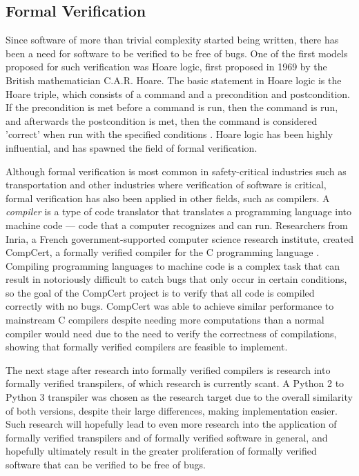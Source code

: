 \subsection{Formal Verification}
Since software of more than trivial complexity started being written, there has been a need for software to be verified to be free of bugs. One of the first models proposed for such verification was Hoare logic, first proposed in 1969 by the British mathematician C.A.R. Hoare. The basic statement in Hoare logic is the Hoare triple, which consists of a command and a precondition and postcondition. If the precondition is met before a command is run, then the command is run, and afterwards the postcondition is met, then the command is considered 'correct' when run with the specified conditions \autocite{Hoare}. Hoare logic has been highly influential, and has spawned the field of formal verification.

Although formal verification is most common in safety-critical industries such as transportation and other industries where verification of software is critical, formal verification has also been applied in other fields, such as compilers. A \textit{compiler} is a type of code translator that translates a programming language into machine code --- code that a computer recognizes and can run. Researchers from Inria, a French government-supported computer science research institute, created CompCert, a formally verified compiler for the C programming language \autocite{Leroy}. Compiling programming languages to machine code is a complex task that can result in notoriously difficult to catch bugs that only occur in certain conditions, so the goal of the CompCert project is to verify that all code is compiled correctly with no bugs. CompCert was able to achieve similar performance to mainstream C compilers despite needing more computations than a normal compiler would need due to the need to verify the correctness of compilations, showing that formally verified compilers are feasible to implement.

The next stage after research into formally verified compilers is research into formally verified transpilers, of which research is currently scant. A Python 2 to Python 3 transpiler was chosen as the research target due to the overall similarity of both versions, despite their large differences, making implementation easier. Such research will hopefully lead to even more research into the application of formally verified transpilers and of formally verified software in general, and hopefully ultimately result in the greater proliferation of formally verified software that can be verified to be free of bugs.